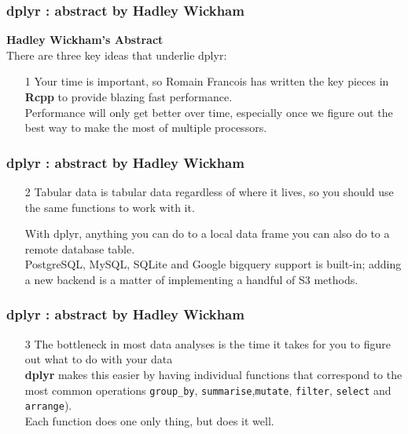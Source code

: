 \documentclass{beamer}
\begin{document}
\begin{frame}
\frametitle{dplyr : abstract by Hadley Wickham}	
\textbf{Hadley Wickham's Abstract}\\
	\noindent There are three key ideas that underlie dplyr:
	
	\begin{enumerate}
		\item[1] Your time is important, so Romain Francois has written the key pieces in \textbf{Rcpp} to provide blazing fast performance. \\ \bigskip Performance will only get better over time, especially once we figure out the best way to make the most of multiple processors. 
\end{enumerate}
\end{frame}
\begin{frame}
\frametitle{dplyr : abstract by Hadley Wickham}	

\begin{enumerate}
		\item[2] Tabular data is tabular data regardless of where it lives, so you should use the same functions to work with it. \\ \bigskip
		
		With dplyr, anything you can do to a local data frame you can also do to a remote database table. \\ \bigskip PostgreSQL, MySQL, SQLite and Google bigquery support is built-in; adding a new backend is a matter of implementing a handful of S3 methods. 
\end{enumerate}
\end{frame}
\begin{frame}
\frametitle{dplyr : abstract by Hadley Wickham}	

	\begin{enumerate}
		\item[3] The bottleneck in most data analyses is the time it takes for you to figure out what to do with your data
		\\ \bigskip \textbf{dplyr} makes this easier by having individual functions that correspond to the most common operations  \texttt{group\_by}, \texttt{summarise},\texttt{mutate}, \texttt{filter}, \texttt{select} and \texttt{arrange}). 	\\ \bigskip Each function does one only thing, but does it well.
	\end{enumerate}
\end{frame}
\end{document}
